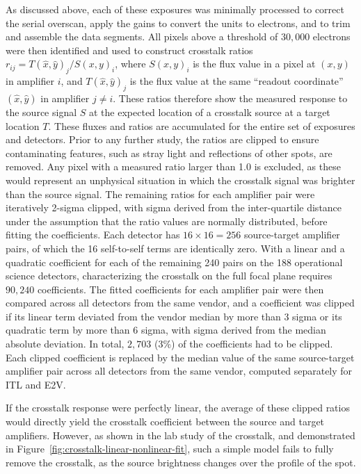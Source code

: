 As discussed above, each of these exposures was minimally processed to correct the serial overscan, apply the gains to convert the units to electrons, and to trim and assemble the data segments.
All pixels above a threshold of $30{,}000$ electrons were then identified and used to construct crosstalk ratios $r_{ij} = T(\hat{x}, \hat{y})_j / S(x, y)_i$, where $S(x, y)_i$ is the flux value in a pixel at $(x, y)$ in amplifier $i$, and $T(\hat{x}, \hat{y})_j$ is the flux value at the same ``readout coordinate'' $(\hat{x}, \hat{y})$ in amplifier $j \ne i$.
These ratios therefore show the measured response to the source signal $S$ at the expected location of a crosstalk source at a target location $T$.
These fluxes and ratios are accumulated for the entire set of exposures and detectors.
Prior to any further study, the ratios are clipped to ensure contaminating features, such as stray light and reflections of other spots, are removed.
Any pixel with a measured ratio larger than 1.0 is excluded, as these would represent an unphysical situation in which the crosstalk signal was brighter than the source signal.
The remaining ratios for each amplifier pair were iteratively 2-sigma clipped, with sigma derived from the inter-quartile distance under the assumption that the ratio values are normally distributed, before fitting the coefficients.
Each detector has $16 \times 16 = 256$ source-target amplifier pairs, of which the 16 self-to-self terms are identically zero.
With a linear and a quadratic coefficient for each of the remaining 240 pairs on the 188 operational science detectors, characterizing the crosstalk on the full focal plane requires $90{,}240$ coefficients.
The fitted coefficients for each amplifier pair were then compared across all detectors from the same vendor, and a coefficient was clipped if its linear term deviated from the vendor median by more than 3 sigma or its quadratic term by more than 6 sigma, with sigma derived from the median absolute deviation.
In total, $2{,}703$ (3\%) of the coefficients had to be clipped.
Each clipped coefficient is replaced by the median value of the same source-target amplifier pair across all detectors from the same vendor, computed separately for ITL and E2V.

If the crosstalk response were perfectly linear, the average of these clipped ratios would directly yield the crosstalk coefficient between the source and target amplifiers.
However, as shown in the lab study of the crosstalk, and demonstrated in Figure~\ref{fig:crosstalk-linear-nonlinear-fit}, such a simple model fails to fully remove the crosstalk, as the source brightness changes over the profile of the spot.

